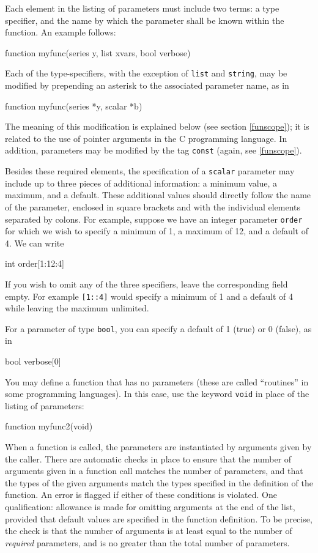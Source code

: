 Each element in the listing of parameters must include two terms: a
type specifier, and the name by which the parameter shall be known
within the function.  An example follows:
%    
\begin{code}
function myfunc(series y, list xvars, bool verbose)
\end{code}

Each of the type-specifiers, with the exception of \texttt{list} and
\texttt{string}, may be modified by prepending an asterisk to the
associated parameter name, as in
%    
\begin{code}
function myfunc(series *y, scalar *b)
\end{code}

The meaning of this modification is explained below (see section
\ref{funscope}); it is related to the use of pointer arguments in the
C programming language.  In addition, parameters may be modified by
the tag \texttt{const} (again, see \ref{funscope}).

Besides these required elements, the specification of a
\texttt{scalar} parameter may include up to three pieces of additional
information: a minimum value, a maximum, and a default.  These
additional values should directly follow the name of the parameter,
enclosed in square brackets and with the individual elements separated
by colons.  For example, suppose we have an integer parameter
\texttt{order} for which we wish to specify a minimum of 1, a maximum
of 12, and a default of 4.  We can write
%    
\begin{code}
int order[1:12:4]
\end{code} 
%
If you wish to omit any of the three specifiers, leave the
corresponding field empty.  For example \texttt{[1::4]} would specify
a minimum of 1 and a default of 4 while leaving the maximum
unlimited.  

For a parameter of type \texttt{bool}, you can specify a default of
1 (true) or 0 (false), as in
%    
\begin{code}
bool verbose[0]
\end{code} 
%

You may define a function that has no parameters (these are called
``routines'' in some programming languages).  In this case,  
use the keyword \texttt{void} in place of the listing of parameters:
%    
\begin{code}
function myfunc2(void)
\end{code}

When a function is called, the parameters are instantiated by
arguments given by the caller.  There are automatic checks in place to
ensure that the number of arguments given in a function call matches
the number of parameters, and that the types of the given arguments
match the types specified in the definition of the function.  An error
is flagged if either of these conditions is violated.  One
qualification: allowance is made for omitting arguments at the end of
the list, provided that default values are specified in the function
definition.  To be precise, the check is that the number of arguments
is at least equal to the number of \textit{required} parameters, and
is no greater than the total number of parameters.


